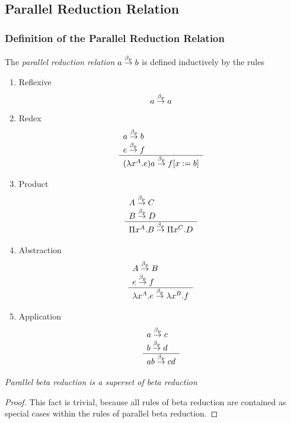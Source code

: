 \subsection{Parallel Reduction Relation}


\subsubsection{Definition of the Parallel Reduction Relation}

\begin{definition}
    The \emph{parallel reduction relation} $a \stackrel{\beta_p}{\to} b$ is defined inductively
    by the rules
    \begin{enumerate}
    \item Reflexive
    $$
        a \stackrel{\beta_p}{\to} a
    $$

    \item Redex
    $$
        \begin{array}{l} 
            a \stackrel{\beta_p}{\to} b
            \\
            e \stackrel{\beta_p}{\to} f
         \\ \hline 
            (\lambda x^A. e) a \stackrel{\beta_p}{\to} f[x:=b]
        \end{array}
    $$

    \item Product
    $$
    \begin{array}{l} 
        A \stackrel{\beta_p}{\to} C
        \\
        B \stackrel{\beta_p}{\to} D
     \\ \hline 
        \Pi x^A. B \stackrel{\beta_p}{\to} \Pi x^C. D
    \end{array}
    $$

    \item Abstraction
    $$
    \begin{array}{l} 
        A \stackrel{\beta_p}{\to} B
        \\
        e \stackrel{\beta_p}{\to} f
     \\ \hline 
        \lambda x^A. e \stackrel{\beta_p}{\to} \lambda x^B. f
    \end{array}
    $$

    \item Application
    $$
    \begin{array}{l} 
        a \stackrel{\beta_p}{\to} c
        \\
        b \stackrel{\beta_p}{\to} d
     \\ \hline 
        a b \stackrel{\beta_p}{\to} c d
    \end{array}
    $$
    \end{enumerate}
\end{definition}


\begin{lemma}
    \label{ReductionLeParallelReduction}
    \emph{Parallel beta reduction is a superset of beta reduction}

    \begin{proof} This fact is trivial, because all rules of beta reduction are
    contained as special cases within the rules of parallel beta reduction.
    \end{proof}
\end{lemma}



